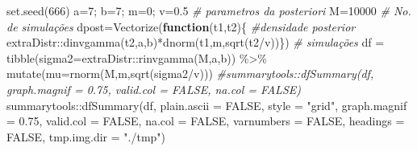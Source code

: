 \documentclass[
]{book}
\newenvironment{Shaded}{\begin{snugshade}}{\end{snugshade}}
\newcommand{\AttributeTok}[1]{\textcolor[rgb]{0.77,0.63,0.00}{#1}}
\newcommand{\CommentTok}[1]{\textcolor[rgb]{0.56,0.35,0.01}{\textit{#1}}}
\newcommand{\ConstantTok}[1]{\textcolor[rgb]{0.00,0.00,0.00}{#1}}
\newcommand{\ControlFlowTok}[1]{\textcolor[rgb]{0.13,0.29,0.53}{\textbf{#1}}}
\newcommand{\DecValTok}[1]{\textcolor[rgb]{0.00,0.00,0.81}{#1}}
\newcommand{\FloatTok}[1]{\textcolor[rgb]{0.00,0.00,0.81}{#1}}
\newcommand{\FunctionTok}[1]{\textcolor[rgb]{0.00,0.00,0.00}{#1}}
\newcommand{\NormalTok}[1]{#1}
\newcommand{\OtherTok}[1]{\textcolor[rgb]{0.56,0.35,0.01}{#1}}
\newcommand{\SpecialCharTok}[1]{\textcolor[rgb]{0.00,0.00,0.00}{#1}}
\newcommand{\StringTok}[1]{\textcolor[rgb]{0.31,0.60,0.02}{#1}}
\begin{document}
\begin{Shaded}
\begin{Highlighting}[]
\FunctionTok{set.seed}\NormalTok{(}\DecValTok{666}\NormalTok{)}
\NormalTok{a}\OtherTok{=}\DecValTok{7}\NormalTok{; b}\OtherTok{=}\DecValTok{7}\NormalTok{; m}\OtherTok{=}\DecValTok{0}\NormalTok{; v}\OtherTok{=}\FloatTok{0.5} \CommentTok{\# parametros da posteriori}
\NormalTok{M}\OtherTok{=}\DecValTok{10000} \CommentTok{\# No. de simulações}
\NormalTok{dpost}\OtherTok{=}\FunctionTok{Vectorize}\NormalTok{(}\ControlFlowTok{function}\NormalTok{(t1,t2)\{ }\CommentTok{\#densidade posterior}
\NormalTok{  extraDistr}\SpecialCharTok{::}\FunctionTok{dinvgamma}\NormalTok{(t2,a,b)}\SpecialCharTok{*}\FunctionTok{dnorm}\NormalTok{(t1,m,}\FunctionTok{sqrt}\NormalTok{(t2}\SpecialCharTok{/}\NormalTok{v))\})}
\CommentTok{\# simulações}
\NormalTok{df }\OtherTok{=} \FunctionTok{tibble}\NormalTok{(}\AttributeTok{sigma2=}\NormalTok{extraDistr}\SpecialCharTok{::}\FunctionTok{rinvgamma}\NormalTok{(M,a,b)) }\SpecialCharTok{\%\textgreater{}\%}  
  \FunctionTok{mutate}\NormalTok{(}\AttributeTok{mu=}\FunctionTok{rnorm}\NormalTok{(M,m,}\FunctionTok{sqrt}\NormalTok{(sigma2}\SpecialCharTok{/}\NormalTok{v)))}
\CommentTok{\#summarytools::dfSummary(df, graph.magnif = 0.75, valid.col = FALSE, na.col = FALSE)}
\NormalTok{summarytools}\SpecialCharTok{::}\FunctionTok{dfSummary}\NormalTok{(df, }\AttributeTok{plain.ascii =} \ConstantTok{FALSE}\NormalTok{, }\AttributeTok{style =} \StringTok{"grid"}\NormalTok{, }
          \AttributeTok{graph.magnif =} \FloatTok{0.75}\NormalTok{, }\AttributeTok{valid.col =} \ConstantTok{FALSE}\NormalTok{, }\AttributeTok{na.col =} \ConstantTok{FALSE}\NormalTok{, }
          \AttributeTok{varnumbers =} \ConstantTok{FALSE}\NormalTok{, }\AttributeTok{headings =} \ConstantTok{FALSE}\NormalTok{, }\AttributeTok{tmp.img.dir =} \StringTok{"./tmp"}\NormalTok{)}
\end{Highlighting}
\end{Shaded}
\end{document}
